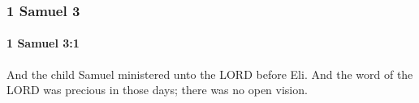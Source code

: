	\subsubsection{1 Samuel 3} %
		\label{1SAMUEL-3}

		\paragraph{1 Samuel 3:1} %
			\label{1SAMUEL-3-1}

			And the child Samuel ministered unto the LORD before Eli. And the word of the LORD was precious in those days; there was no open vision.


